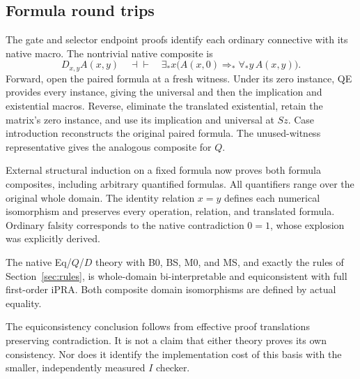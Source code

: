 \subsection{Formula round trips}
The gate and selector endpoint proofs identify each ordinary connective
with its native macro. The nontrivial native composite is
\[
 D_{x,y}A(x,y)\quad\dashv\vdash\quad
 \exists_*x\bigl(A(x,0)\Rightarrow_*\forall_*y\,A(x,y)\bigr).
\]
Forward, open the paired formula at a fresh witness. Under its zero
instance, QE provides every instance, giving the universal and then the
implication and existential macros. Reverse, eliminate the translated
existential, retain the matrix's zero instance, and use its implication
and universal at $Sz$. Case introduction reconstructs the original
paired formula. The unused-witness representative gives the analogous
composite for $Q$.

External structural induction on a fixed formula now proves both
formula composites, including arbitrary quantified formulas. All
quantifiers range over the original whole domain. The identity relation
$x=y$ defines each numerical isomorphism and preserves every operation,
relation, and translated formula. Ordinary falsity corresponds to the
native contradiction $0=1$, whose explosion was explicitly derived.

\begin{theorem}
The native Eq/$Q$/$D$ theory with B0, BS, M0, and MS, and exactly the
rules of Section~\ref{sec:rules}, is whole-domain bi-interpretable and
equiconsistent with full first-order iPRA. Both composite domain
isomorphisms are defined by actual equality.
\end{theorem}

The equiconsistency conclusion follows from effective proof
translations preserving contradiction. It is not a claim that either
theory proves its own consistency. Nor does it identify the implementation
cost of this basis with the smaller, independently measured $I$ checker.
